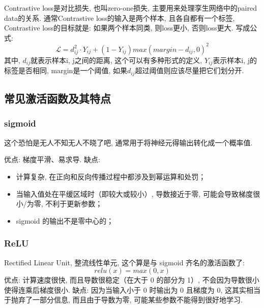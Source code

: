 Contrastive loss是对比损失, 也叫zero-one损失, 主要用来处理孪生网络中的paired data的关系. 通常Contrastive loss的输入是两个样本, 且各自都有一个标签, Contrastive loss的目标就是: 如果两个样本同类, 则loss更小, 否则loss更大. 写成公式: 
$$
\mathcal{L} = d_{ij}^2 \cdot Y_{ij} + (1 - Y_{ij} )max(margin - d_{ij}, 0)^2
$$
其中, $d_{ij}$就表示样本i, j之间的距离, 这个可以有多种形式的定义, $Y_{ij}$表示样本i, j的标签是否相同, margin是一个阈值, 如果$d_{ij}$超过阈值则应该尽量把它们划分开. 

\subsection{常见激活函数及其特点}
\subsubsection{sigmoid}
\begin{center}
\end{center}
这个恐怕是无人不知无人不晓了吧, 通常用于将神经元得输出转化成一个概率值. 

优点: 梯度平滑、易求导. 缺点: 
\begin{itemize}
	\item 计算复杂, 在正向和反向传播过程中都涉及到幂运算和处罚；
	
	\item 当输入值处在平缓区域时（即较大或较小）, 导数接近于零, 可能会导致梯度很小/为零, 不利于更新参数；
	
	\item sigmoid 的输出不是零中心的；
\end{itemize}


\subsubsection{ReLU}
Rectified Linear Unit, 整流线性单元, 这个算是与 sigmoid 齐名的激活函数了: 
$$
relu(x) = max(0, x)
$$
优点: 计算速度很快, 而且导数很稳定（在大于 0 的部分为 1）, 不会因为导数很小使得连乘后梯度很小. 缺点: 因为当输入小于 0 时输出为 0 且梯度为 0, 这其实相当于抛弃了一部分信息, 而且由于导数为零, 可能某些参数不能得到很好地学习. 

